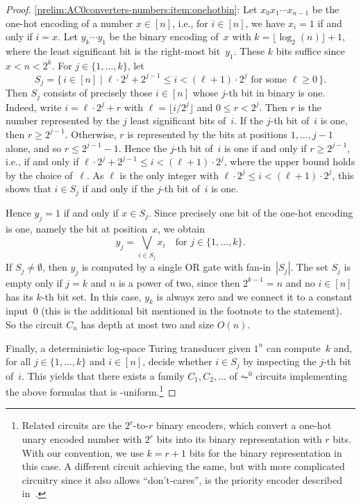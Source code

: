 \begin{proof}	
\ref{prelim:AC0converters-numbers:item:onehotbin}: 
Let $x_0 x_1 \cdots x_{n-1}$ be the one-hot encoding of a number $x \in [n]$,
i.e., for $i \in [n]$, we have $x_i = 1$ if and only if $i = x$.
Let $y_k \cdots y_1$ be the binary encoding of~$x$ with $k = \lfloor \log_2(n) \rfloor + 1$,
where the least significant bit is the right-most bit~$y_1$.
These $k$ bits suffice since $x < n < 2^k$.
For $j \in \{1,\ldots,k\}$, let
\[
S_j = \{\, i \in [n] \mid \ell \cdot 2^j + 2^{j-1} \le i < (\ell+1) \cdot 2^j \text{ for some } \ell \ge 0 \,\}.
\]
Then $S_j$ consists of precisely those $i \in [n]$ whose $j$-th bit in binary is one.
Indeed, write $i = \ell \cdot 2^j + r$ with $\ell = \lfloor i / 2^j \rfloor$ and $0 \le r < 2^j$.
Then $r$ is the number represented by the $j$ least significant bits of~$i$.
If the $j$-th bit of~$i$ is one, then $r \ge 2^{j-1}$.
Otherwise, $r$ is represented by the bits at positions $1, \ldots, j-1$ alone,
and so $r \le 2^{j-1} - 1$.
Hence the $j$-th bit of~$i$ is one if and only if $r \ge 2^{j-1}$,
i.e., if and only if $\ell \cdot 2^j + 2^{j-1} \le i < (\ell+1) \cdot 2^j$,
where the upper bound holds by the choice of~$\ell$.
As $\ell$ is the only integer with $\ell \cdot 2^j \le i < (\ell+1) \cdot 2^j$,
this shows that $i \in S_j$ if and only if the $j$-th bit of~$i$ is one.

Hence $y_j = 1$ if and only if $x \in S_j$.
Since precisely one bit of the one-hot encoding is one, namely the bit at position~$x$, 
we obtain
\[
y_j = \bigvee_{i \in S_j} x_i \quad \text{for } j \in \{1,\ldots,k\}.
\]
If $S_j \neq \emptyset$, then $y_j$ is computed by a single {\sc OR} gate with fan-in~$|S_j|$.
The set $S_j$ is empty only if $j = k$ and $n$ is a power of two,
since then $2^{k-1} = n$ and no $i \in [n]$ has its $k$-th bit set.
In this case, $y_k$ is always zero and we connect it to a constant input~$0$
(this is the additional bit mentioned in the footnote to the statement).
So the circuit $C_n$ has depth at most two and size $O(n)$.

Finally, a deterministic log-space Turing transducer
given $1^n$ can compute~$k$ and, for all $j \in \{1,\ldots,k\}$ and $i \in [n]$,
decide whether $i \in S_j$ by inspecting the $j$-th bit of~$i$.
This yields that there exists a family $C_1, C_2, \ldots$ of $\AC^0$ circuits implementing the above formulas 
that is \LOGSPACE-uniform.\footnote{Related circuits are the $2^r$-to-$r$ binary encoders,
	which convert a one-hot unary encoded number with $2^r$ bits
	into its binary representation with $r$ bits.
	With our convention, we use $k = r + 1$ bits for the binary representation in this case.
	A different circuit achieving the same, but with more complicated circuitry
	since it also allows ``don't-cares'',
	is the priority encoder described in~\cite[p.~117]{Kohavi70}.}


\end{proof}
